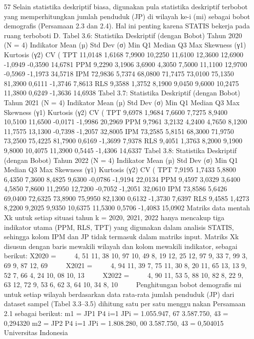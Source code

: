 57
Selain statistika deskriptif biasa, digunakan pula statistika deskriptif terbobot yang
memperhitungkan jumlah penduduk (JP) di wilayah ke-i (mi) sebagai bobot demografis
(Persamaan 2.3 dan 2.4). Hal ini penting karena STATIS bekerja pada ruang terboboti D.
Tabel 3.6: Statistika Deskriptif (dengan Bobot) Tahun 2020 (N = 4)
Indikator Mean (µ) Std Dev (σ) Min Q1 Median Q3 Max Skewness (γ1) Kurtosis (γ2) CV (%
TPT 11,0148 1,6168 7,9900 10,2250 11,6100 12,3600 12,6900 -1,0949 -0,3590 14,6781
PPM 9,2290 3,1906 3,6900 4,3050 7,5000 11,1100 12,9700 -0,5969 -1,1973 34,5718
IPM 72,9836 5,7374 68,0800 71,7475 73,0100 75,1350 81,3900 0,6111 -1,3746 7,8613
RLS 9,3588 1,3752 8,1900 9,0450 9,6000 10,2475 11,3800 0,6249 -1,3636 14,6938
Tabel 3.7: Statistika Deskriptif (dengan Bobot) Tahun 2021 (N = 4)
Indikator Mean (µ) Std Dev (σ) Min Q1 Median Q3 Max Skewness (γ1) Kurtosis (γ2) CV (%
TPT 9,6978 1,9684 7,6600 7,7275 8,9400 10,5100 11,6500 -0,0171 -1,9986 20,2969
PPM 9,7961 3,2132 4,2400 4,7650 8,1200 11,7575 13,1300 -0,7398 -1,2057 32,8005
IPM 73,2585 5,8151 68,3000 71,9750 73,2500 75,4225 81,7900 0,6169 -1,3699 7,9378
RLS 9,4051 1,3763 8,2000 9,1900 9,8000 10,4075 11,3900 0,5445 -1,4306 14,6337
Tabel 3.8: Statistika Deskriptif (dengan Bobot) Tahun 2022 (N = 4)
Indikator Mean (µ) Std Dev (σ) Min Q1 Median Q3 Max Skewness (γ1) Kurtosis (γ2) CV (%
TPT 7,9195 1,7433 5,8800 6,4350 7,3600 8,4825 9,6300 -0,0786 -1,9194 22,0134
PPM 9,4597 3,0329 3,6400 4,5850 7,8600 11,2950 12,7200 -0,7052 -1,2051 32,0610
IPM 73,8586 5,6426 69,0400 72,6325 73,8900 75,9950 82,1300 0,6132 -1,3730 7,6397
RLS 9,4585 1,4273 8,2200 9,2025 9,9350 10,6375 11,5300 0,5706 -1,4083 15,0902
Matriks data mentah Xk untuk setiap situasi tahun k = 2020, 2021, 2022 hanya
mencakup tiga indikator utama (PPM, RLS, TPT) yang digunakan dalam analisis STATIS,
sehingga kolom IPM dan JP tidak termasuk dalam matriks input. Matriks Xk disusun
dengan baris mewakili wilayah dan kolom mewakili indikator, sebagai berikut:
X2020 =


4, 51 11, 38 10, 97
10, 49 8, 19 12, 25
12, 97 9, 33 7, 99
3, 69 9, 87 12, 69


X2021 =


4, 94 11, 39 7, 75
11, 30 8, 20 11, 65
13, 13 9, 52 7, 66
4, 24 10, 08 10, 13


X2022 =


4, 90 11, 53 5, 88
10, 82 8, 22 9, 63
12, 72 9, 53 6, 62
3, 64 10, 34 8, 10


Penghitungan bobot demografis mi untuk setiap wilayah berdasarkan data rata-rata
jumlah penduduk (JP) dari dataset sampel (Tabel 3.3–3.5) dihitung satu per satu menggunakan Persamaan 2.1 sebagai berikut:
m1 =
JP1
P4
i=1 JPi
=
1.055.947, 67
3.587.750, 43
= 0,294320
m2 =
JP2
P4
i=1 JPi
=
1.808.280, 00
3.587.750, 43
= 0,504015
Universitas Indonesia

